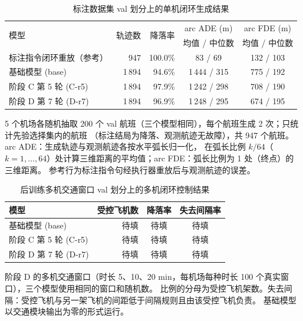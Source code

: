 
\begin{table}[htbp]
  \centering
  \caption{标注数据集 val 划分上的单机闭环生成结果}
  \label{tab:two_tier_val_single}
  \begin{tabular}{lrrcc}
    \toprule
    \multirow{2}{*}{模型} & \multirow{2}{*}{轨迹数} & \multirow{2}{*}{降落率} & arc ADE (m) & arc FDE (m) \\
     & & & 均值 / 中位数 & 均值 / 中位数 \\
    \midrule
    标注指令闭环重放（参考） & 947   & 100.0\% & 83 / 69     & 132 / 103 \\
    \midrule
    基础模型 (base)          & 1\,894 & 94.6\%  & 1\,444 / 315 & 775 / 192 \\
    阶段 C 第 5 轮 (C-r5)    & 1\,894 & 97.9\%  & 1\,242 / 298 & 708 / 190 \\
    阶段 D 第 7 轮 (D-r7)    & 1\,894 & 96.9\%  & 1\,248 / 295 & 674 / 195 \\
    \bottomrule
  \end{tabular}
  \par\smallskip
  \parbox{0.95\linewidth}{\footnotesize
    5 个机场各随机抽取 200 个 val 航班（三个模型相同），每个航班生成 2 次；只统计先验选择集内的航班
    （标注结局为降落、观测航迹无故障），共 947 个航班。arc ADE：生成轨迹与观测航迹各按水平弧长归一化，
    在弧长比例 $k/64$（$k=1,\dots,64$）处计算三维距离的平均值；arc FDE：弧长比例为 1 处（终点）的三维距离。
    参考行为标注指令句经执行器重放后与观测航迹的误差。}
\end{table}

\begin{table}[htbp]
  \centering
  \caption{后训练多机交通窗口 val 划分上的多机闭环控制结果}
  \label{tab:two_tier_val_multi}
  \begin{tabular}{lrcc}
    \toprule
    模型 & 受控飞机数 & 降落率 & 失去间隔率 \\
    \midrule
    基础模型 (base)       & 待填 & 待填 & 待填 \\
    阶段 C 第 5 轮 (C-r5) & 待填 & 待填 & 待填 \\
    阶段 D 第 7 轮 (D-r7) & 待填 & 待填 & 待填 \\
    \bottomrule
  \end{tabular}
  \par\smallskip
  \parbox{0.95\linewidth}{\footnotesize
    阶段 D 的多机交通窗口（时长 5、10、20 min，每机场每种时长 100 个真实窗口），三个模型使用相同的窗口和随机数。
    比例的分母为受控飞机架数。失去间隔：受控飞机与另一架飞机的间距低于间隔规则且由该受控飞机负责。
    基础模型以交通模块输出为零的形式运行。}
\end{table}
